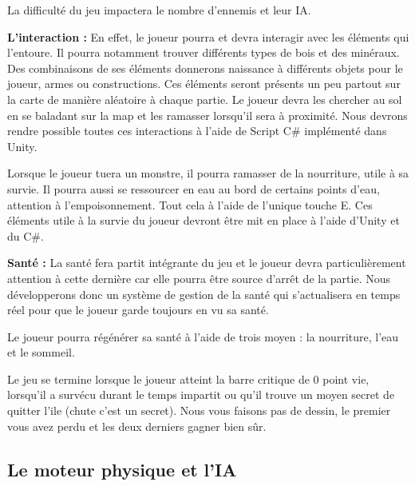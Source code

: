 \documentclass{article}
\begin{document}
\par 
La difficulté du jeu impactera le nombre d'ennemis et leur IA.
\newline
\newline
\newline
\newline
\par
\textbf{L'interaction :} En effet, le joueur pourra et devra interagir avec les éléments qui l'entoure. Il pourra notamment trouver différents types de bois et des minéraux. Des combinaisons de ses éléments donnerons naissance à différents objets pour le joueur, armes ou constructions. Ces éléments seront présents un peu partout sur la carte de manière aléatoire à chaque partie. Le joueur devra les chercher au sol en se baladant sur la map et les ramasser lorsqu'il sera à proximité. Nous devrons rendre possible toutes ces interactions à l'aide de Script C\# implémenté dans Unity.
\newline
\par 
Lorsque le joueur tuera un monstre, il pourra ramasser de la nourriture, utile à sa survie. Il pourra aussi se ressourcer en eau au bord de certains points d'eau, attention à l'empoisonnement. Tout cela à l'aide de l'unique touche E. Ces éléments utile à la survie du joueur devront être mit en place à l'aide d'Unity et du C\#.
\newline

\par
\textbf{Santé :} La santé fera partit intégrante du jeu et le joueur devra particulièrement attention à cette dernière car elle pourra être source d'arrêt de la partie. Nous développerons donc un système de gestion de la santé qui s'actualisera en temps réel pour que le joueur garde toujours en vu sa santé.
\newline

\par 
Le joueur pourra régénérer sa santé à l'aide de trois moyen : la nourriture, l'eau et le sommeil.
\newline

\par
Le jeu se termine lorsque le joueur atteint la barre critique de 0 point vie, lorsqu'il a survécu durant le temps impartit ou qu'il trouve un moyen secret de quitter l'ile (chute c'est un secret). Nous vous faisons pas de dessin, le premier vous avez perdu et les deux derniers gagner bien sûr.

\subsection{Le moteur physique et l'IA}
\end{document}
